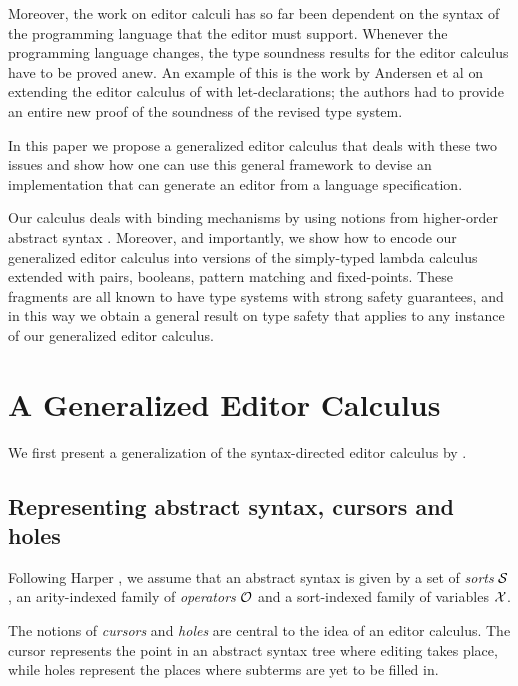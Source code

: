\documentclass[sigplan,review]{acmart}
\begin{document}
Moreover, the work on editor calculi has so far been dependent on the
syntax of the programming language that the editor must
support. Whenever the programming language changes, the type soundness
results for the editor calculus have to be proved anew. An example of
this is the work by Andersen et al \cite{10.1145/3587216.3587221} on
extending the editor calculus of \cite{type_safe_structure_editor}
with let-declarations; the authors had to provide an entire new proof
of the soundness of the revised type system.

In this paper we propose a generalized editor calculus that deals with
these two issues and show how one can use this general framework to
devise an implementation that can generate an editor from a language
specification. 

Our calculus deals with binding mechanisms by using notions from
higher-order abstract syntax \cite{hoas}. Moreover, and importantly,
we show how to encode our generalized editor calculus into versions of
the simply-typed lambda calculus extended with pairs, booleans,
pattern matching and fixed-points. These fragments are all known to
have type systems with strong safety guarantees, and in this way we
obtain a general result on type safety that applies to any instance of
our generalized editor calculus.

\section{A Generalized Editor Calculus}\label{sec:general_editor}

We first present a generalization of the syntax-directed editor
calculus by \cite{type_safe_structure_editor}.

\subsection{Representing abstract syntax, cursors and holes}

Following Harper \cite{harper_foundations}, we assume that an abstract
syntax is given by a set of \emph{sorts} $\mathcal{S}$, an arity-indexed
family of \emph{operators} $\mathcal{O}$ and a sort-indexed family of
variables $\mathcal{X}$.

The notions of \emph{cursors} and \emph{holes} are central to the idea
of an editor calculus. The cursor represents the point in an abstract
syntax tree where editing takes place, while holes represent the
places where subterms are yet to be filled in.
\end{document}
